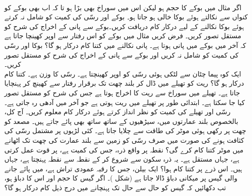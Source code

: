 \\
اگر مثال  میں بوکے  کا حجم  ہو لیکن اس میں سوراخ بھی بڑا ہو تا کہ اب بھی  بوکے کو کنواں سے نکالتے ہوئے بوکا خالی ہو جاتا ہو۔ بوکے  اور رسّی کی کمیت کو شامل نہ کرتے ہوئے  بوکا نکالنے کے لیے درکار کام دریافت کریں۔بوکے  سے پانی کے اخراج  کی شرح کو مستقل تصور کریں۔
فرض کریں  مثال  میں بوکے  کو اس رفتار سے اوپر کھینچا جاتا ہے کہ آخر میں بوکے میں  پانی ہوتا ہے۔ پانی نکالنے میں کتنا کام درکار ہو گا؟  بوکا اور رسّی کی کمیت کو شامل نہ کریں اور بوکے سے پانی کے اخراج  کی شرح کو مستقل تصور کریں۔\\
ایک کوہ پیما چٹان سے لٹکی ہوئی  رسّی کو اوپر کھینچتا ہے۔ رسّی کا  وزن  ہے۔ کتنا کام درکار ہو گا؟
ریت کو تھیلے میں ڈال کر  بلند چھت تک برقرار رفتار سے کھینچ کر پہنچایا جاتا ہے۔ تھیلے میں سوراخ سے ریت کا اخراج ہوتا ہے جس کی شرح  کو مستقل تصور کیا جا سکتا ہے۔  ابتدائی طور پر تھیلے  میں  ریت  ہوتی ہے جو  آخر میں آدھی رہ جاتی ہے۔ رسّی اور تھیلے کی کمیت کو نظر انداز کرتے ہوئے درکار کام معلوم کریں۔
آج کل، بالخصوص بلند  عمارتوں میں، سیڑھیوں کے ساتھ ساتھ   بھی پائے جاتے ہیں۔ مصعد کو چھت پر رکھی  ہوئی موٹر کی طاقت سے چلایا جاتا ہے۔  کئی لڑیوں پر مشتمل رسّی کی کثافت  ہونے کی صورت میں صرف رسّی کو زمین سے   بلند عمارت کی چھت تک اٹھانے میں موٹر کتنا کام کرے گی؟
نقطہ  پر واقع ذرہ، جس کی کمیت  ہے، پر قوت  عمل کرتی ہے، جہاں  مستقل ہے۔ یہ ذرہ سکون سے شروع  کر کے   نقطہ  سے نقطہ  پہنچتا ہے، جہاں  ہیں۔ اس ذرے پر کتنا کام ہوا؟
ایک بیلن، جس کا رقبہ عمودی تراش  ہے، میں  پائے جانے والی گیس پر میکانی دباؤ ڈالا جاتا ہے (شکل )۔ اگر گیس کا حجم  اور اس کا دباؤ  ہو، تب دکھائیں کہ گیس کو  حال سے  حال تک پہنچانے میں درج ذیل  کام درکار ہو گا؟  
